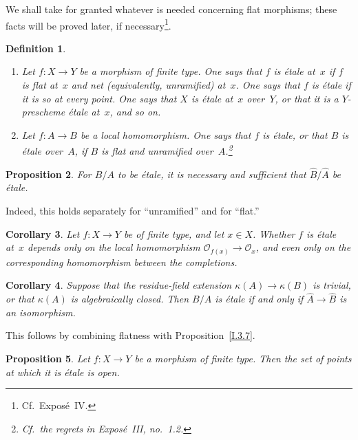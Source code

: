 \documentclass[11pt,oneside]{amsbook}
\newtheorem{proposition}{Proposition}[section]
\newtheorem{corollary}[proposition]{Corollary}
\newtheorem{definition}[proposition]{Definition}
\begin{document}
We shall take for granted whatever is needed concerning flat morphisms; these
facts will be proved later, if necessary\footnote{Cf.\ Expos\'e~IV.}.

\begin{definition}
\label{I.4.1}
\begin{enumerate}
\item[(a)] Let \(f\colon X\to Y\) be a morphism of finite type.  One says
  that \(f\) is \emph{étale} at~\(x\) if \(f\) is flat at~\(x\) and net
  (equivalently, unramified) at~\(x\).  One says that \(f\) is étale if it
  is so at every point.  One says that \(X\) is étale at~\(x\) over~\(Y\),
  or that it is a \(Y\)-prescheme étale at~\(x\), and so on.
\item[(b)] Let \(f\colon A\to B\) be a local homomorphism.  One says that
  \(f\) is étale, or that \(B\) is étale over~\(A\), if \(B\) is flat and
  unramified over~\(A\).\footnote{Cf.\ the regrets in Expos\'e~III,
  no.~1.2.}
\end{enumerate}
\end{definition}

\begin{proposition}
\label{I.4.2}
For \(B/A\) to be étale, it is necessary and sufficient that
\(\widehat B/\widehat A\) be étale.
\end{proposition}

Indeed, this holds separately for ``unramified'' and for ``flat.''

\begin{corollary}
\label{I.4.3}
Let \(f\colon X\to Y\) be of finite type, and let \(x\in X\).  Whether
\(f\) is étale at~\(x\) depends only on the local homomorphism
\(\mathcal O_{f(x)}\to\mathcal O_x\), and even only on the corresponding
homomorphism between the completions.
\end{corollary}

\begin{corollary}
\label{I.4.4}
Suppose that the residue-field extension
\(\kappa(A)\to\kappa(B)\) is trivial, or that \(\kappa(A)\) is
algebraically closed.  Then \(B/A\) is étale if and only if
\(\widehat A\to\widehat B\) is an isomorphism.
\end{corollary}

This follows by combining flatness with Proposition~\ref{I.3.7}.

\begin{proposition}
\label{I.4.5}
Let \(f\colon X\to Y\) be a morphism of finite type.  Then the set of
points at which it is étale is open.
\end{proposition}
\end{document}
